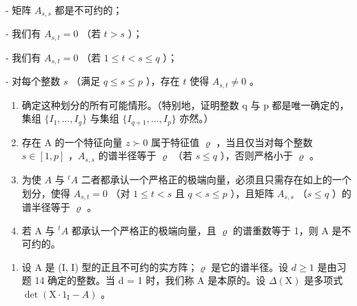 - 矩阵 \(A_{s,s}\) 都是不可约的；

- 我们有 \(A_{s,t} = 0\) （若 \(t > s\) ）；

- 我们有 \(A_{s,t} = 0\) （若 \(1 \leqslant t < s \leqslant q\) ）；

- 对每个整数 \(s\) （满足 \(q \leqslant s \leqslant p\) ），存在 \(t\) 使得 \(A_{s,t} \neq 0\) 。

\begin{enumerate}
\def\labelenumi{\alph{enumi})}
\setcounter{enumi}{1}
\item
  确定这种划分的所有可能情形。（特别地，证明整数 q 与 p 都是唯一确定的，集组 \(\{I_{1},\ldots,I_{g}\}\) 与集组 \(\{I_{q+1},\ldots,I_{p}\}\) 亦然。）
\item
  存在 A 的一个特征向量 \(z \succ 0\) 属于特征值 \(\varrho\) ，当且仅当对每个整数 \(s \in [1, p]\) ，\(A_{s,s}\) 的谱半径等于 \(\varrho\) （若 \(s \leqslant q\) ），否则严格小于 \(\varrho\) 。
\item
  为使 \(A\) 与 \({}^t A\) 二者都承认一个严格正的极端向量，必须且只需存在如上的一个划分，使得 \(A_{s,t} = 0\) （对 \(1 \leqslant t < s\) 且 \(q < s \leqslant p\) ），且矩阵 \(A_{s,s}\) （\(s \leqslant q\) ）的谱半径等于 \(\varrho\) 。
\item
  若 A 与 \(^{t}A\) 都承认一个严格正的极端向量，且 \(\varrho\) 的谱重数等于 1，则 A 是不可约的。
\end{enumerate}

\begin{enumerate}
\def\labelenumi{\arabic{enumi})}
\setcounter{enumi}{21}
\tightlist
\item
  设 A 是 (I, I) 型的正且不可约的实方阵；\(\varrho\) 是它的谱半径。设 \(d \geqslant 1\) 是由习题 14 确定的整数。当 d = 1 时，我们称 A 是本原的。设 \(\Delta(\mathrm{X})\) 是多项式 \(\det(\mathrm{X} \cdot 1_{\mathrm{I}} - A)\) 。
\end{enumerate}


